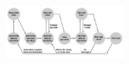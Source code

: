 \documentclass[10pt]{article}
\begin{document}
\begin{multicols*}{2}
    \begin{figure}[H]
        \centering
        \includegraphics[width=0.4\textwidth]{cycle.png}
    \end{figure}






\end{multicols*}
\end{document}
